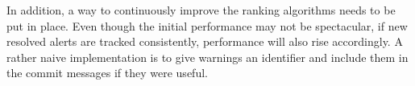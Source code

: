In addition, a way to continuously improve the ranking algorithms needs to be put in place. Even though the initial performance may not be spectacular, if new resolved alerts are tracked consistently, performance will also rise accordingly. A rather naive implementation is to give warnings an identifier and include them in the commit messages if they were useful.


